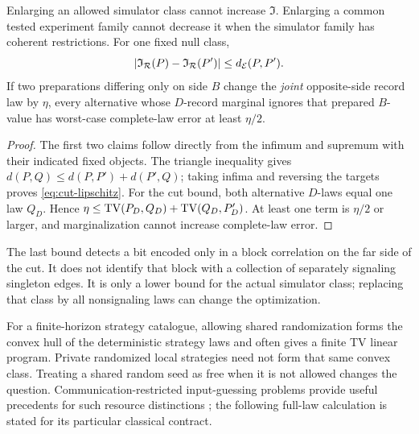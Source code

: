 \begin{proposition}\label{p2-10}
Enlarging an allowed simulator class cannot increase \(\mathfrak I\). Enlarging a common tested experiment family cannot decrease it when the simulator family has coherent restrictions. For one fixed null class,
\begin{equation}\label{eq:cut-lipschitz}
 |\mathfrak I_{\mathcal R}(P)-\mathfrak I_{\mathcal R}(P')|
 \le d_{\mathcal E}(P,P').
\end{equation}
If two preparations differing only on side \(B\) change the \emph{joint} opposite-side record law by \(\eta\), every alternative whose \(D\)-record marginal ignores that prepared \(B\)-value has worst-case complete-law error at least \(\eta/2\).
\end{proposition}
\begin{proof}
The first two claims follow directly from the infimum and supremum with their indicated fixed objects. The triangle inequality gives \(d(P,Q)\le d(P,P')+d(P',Q)\); taking infima and reversing the targets proves \cref{eq:cut-lipschitz}. For the cut bound, both alternative \(D\)-laws equal one law \(Q_D\). Hence
\(\eta\le\operatorname{TV}(P_D,Q_D)+\operatorname{TV}(Q_D,P_D')\). At least one term is \(\eta/2\) or larger, and marginalization cannot increase complete-law error.
\end{proof}
The last bound detects a bit encoded only in a block correlation on the far side of the cut. It does not identify that block with a collection of separately signaling singleton edges. It is only a lower bound for the actual simulator class; replacing that class by all nonsignaling laws can change the optimization.

For a finite-horizon strategy catalogue, allowing shared randomization forms the convex hull of the deterministic strategy laws and often gives a finite TV linear program. Private randomized local strategies need not form that same convex class. Treating a shared random seed as free when it is not allowed changes the question. Communication-restricted input-guessing problems provide useful precedents for such resource distinctions \cite{AlmeidaEtAl2010}; the following full-law calculation is stated for its particular classical contract.

